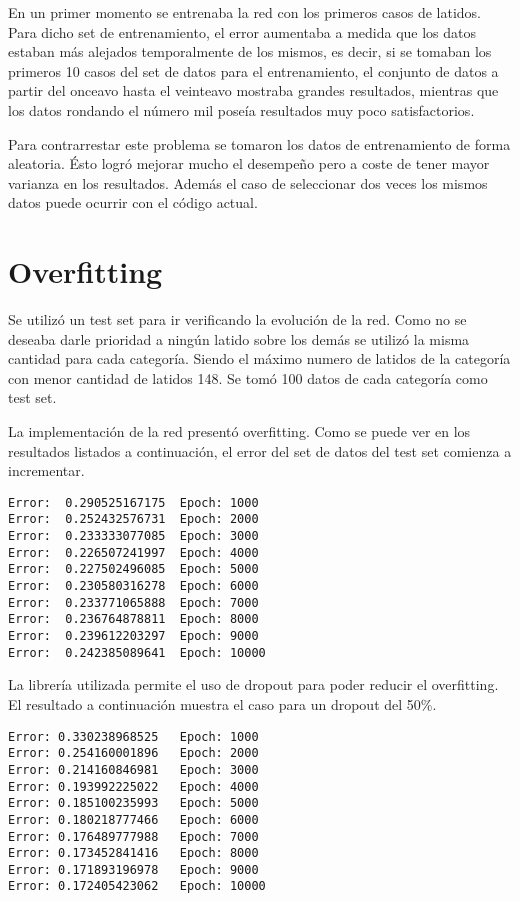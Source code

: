 \documentclass[conference]{IEEEtran}
\theoremstyle{definition}
\begin{document}
En un primer momento se entrenaba la red con los primeros casos de latidos. Para dicho set de entrenamiento, el error aumentaba a medida que los datos estaban m\'{a}s alejados temporalmente de los mismos, es decir, si se tomaban los primeros 10 casos del set de datos para el entrenamiento, el conjunto de datos a partir del onceavo hasta el veinteavo mostraba grandes resultados, mientras que los datos rondando el n\'{u}mero mil pose\'{i}a resultados muy poco satisfactorios.

Para contrarrestar este problema se tomaron los datos de entrenamiento de forma aleatoria. \'{E}sto logr\'{o} mejorar mucho el desempe\~{n}o pero a coste de tener mayor varianza en los resultados. Adem\'{a}s el caso de seleccionar dos veces los mismos datos puede ocurrir con el c\'{o}digo actual.

\section{Overfitting}

Se utiliz\'{o} un test set para ir verificando la evoluci\'{o}n de la red. Como no se deseaba darle prioridad a ning\'{u}n latido sobre los dem\'{a}s se utiliz\'{o} la misma cantidad para cada categor\'{i}a. Siendo el m\'{a}ximo numero de latidos de la categor\'{i}a con menor cantidad de latidos 148. Se tom\'{o} 100 datos de cada categor\'{i}a como test set.

La implementaci\'{o}n de la red present\'{o} overfitting. Como se puede ver en los resultados listados a continuaci\'{o}n, el error del set de datos del test set comienza a incrementar.

\begin{lstlisting}[frame=single]
Error: 	0.290525167175 	Epoch: 1000
Error: 	0.252432576731 	Epoch: 2000
Error: 	0.233333077085 	Epoch: 3000
Error: 	0.226507241997 	Epoch: 4000
Error: 	0.227502496085 	Epoch: 5000
Error: 	0.230580316278 	Epoch: 6000
Error: 	0.233771065888 	Epoch: 7000
Error: 	0.236764878811 	Epoch: 8000
Error: 	0.239612203297 	Epoch: 9000
Error: 	0.242385089641 	Epoch: 10000
\end{lstlisting}

La librer\'{i}a utilizada \cite{NIMBLENET} permite el uso de dropout para poder reducir el overfitting. El resultado a continuaci\'{o}n muestra el caso para un dropout del 50\%.

\begin{lstlisting}[frame=single]
Error: 0.330238968525 	Epoch: 1000
Error: 0.254160001896 	Epoch: 2000
Error: 0.214160846981 	Epoch: 3000
Error: 0.193992225022 	Epoch: 4000
Error: 0.185100235993 	Epoch: 5000
Error: 0.180218777466 	Epoch: 6000
Error: 0.176489777988 	Epoch: 7000
Error: 0.173452841416 	Epoch: 8000
Error: 0.171893196978 	Epoch: 9000
Error: 0.172405423062 	Epoch: 10000
\end{lstlisting}
\end{document}
